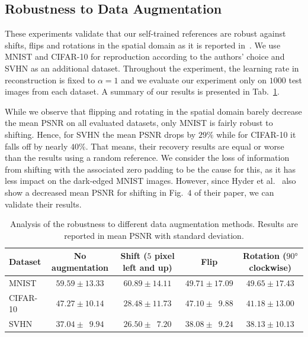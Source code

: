 \subsection{Robustness to Data Augmentation}

These experiments validate that our self-trained references are robust
against shifts, flips and rotations in the spatial domain as it is
reported in~\cite{hyder2020solving}. We use MNIST and CIFAR-10 for
reproduction according to the authors' choice and SVHN as an
additional dataset. Throughout the experiment, the learning rate in reconstruction
is fixed to $\alpha = 1$ and we evaluate our experiment only on $1000$
test images from each dataset. A summary of our results is presented in
Tab.~\ref{results:augmentation}.

While we observe that flipping and rotating in the spatial domain
barely decrease the mean PSNR on all evaluated datasets, only MNIST is
fairly robust to shifting. Hence, for SVHN the mean PSNR drops by
$29\%$ while for CIFAR-10 it falls off by nearly $40\%$. That means,
their recovery results are equal or worse than the results using a random reference. We consider the loss of information from shifting with the associated zero padding to be the cause for this, as it has less impact on the dark-edged MNIST images. However, since Hyder et al.~\cite{hyder2020solving} also show a decreased mean PSNR for shifting in Fig.~$4$ of their paper, we can validate their results.

\begin{table}
	\centering\small
	\begin{tabular}{lcccc}
		\toprule
		Dataset & No augmentation& Shift ($5$ pixel left and up) & Flip & Rotation ($\ang{90}$ clockwise) \\
		\midrule
		MNIST & $59.59\pm 13.33 $& $ 60.89\pm 14.11$ & $49.71 \pm 17.09$ & $49.65 \pm 17.43$ \\
		CIFAR-10 &  $47.27\pm 10.14 $ & $ 28.48\pm 11.73$ & $47.10 \pm \phantom{0}9.88$ & $41.18 \pm 13.00$ \\
		SVHN & $37.04\pm \phantom{0}9.94$ & $ 26.50\pm \phantom{0}7.20$ & $38.08 \pm  \phantom{0}9.24$ & $38.13 \pm 10.13$ \\


		\bottomrule
	\end{tabular}
	\caption{Analysis of the robustness to different data augmentation methods. Results are reported in mean PSNR with standard deviation.}
	\label{results:augmentation}
\end{table}


